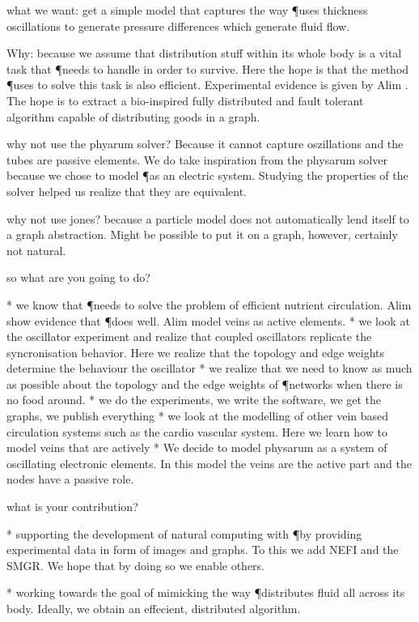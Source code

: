 what we want: get a simple model that captures the way \P uses thickness oscillations to generate pressure differences which generate fluid flow. 

Why: because we assume that distribution stuff within its whole body is a vital task that \P needs to handle in order to survive. Here the hope is that the method \P uses to solve this task is also efficient. Experimental evidence is given by Alim \etal. The hope is to extract a bio-inspired fully distributed and fault tolerant algorithm capable of distributing goods in a graph.

why not use the phyarum solver? Because it cannot capture oszillations and the tubes are passive elements. We do take inspiration from the physarum solver because we chose to model \P as an electric system. Studying the properties of the solver helped us realize that they are equivalent.

why not use jones? because a particle model does not automatically lend itself to a graph abstraction. Might be possible to put it on a graph, however, certainly not natural.

so what are you going to do?

* we know that \P needs to solve the problem of efficient nutrient circulation. Alim \etal show evidence that \P does well. Alim \etal model veins as active elements.
* we look at the oscillator experiment and realize that coupled oscillators replicate the syncronisation behavior. Here we realize that the topology and edge weights determine the behaviour the oscillator
* we realize that we need to know as much as possible about the topology and the edge weights of \P networks when there is no food around.
* we do the experiments, we write the software, we get the graphs, we publish everything
* we look at the modelling of other vein based circulation systems such as the cardio vascular system. Here we learn how to model veins that are actively
* We decide to model physarum as a system of oscillating electronic elements. In this model the veins are the active part and the nodes have a passive role.

what is your contribution?

* supporting the development of natural computing with \P by providing experimental data in form of images and graphs. To this we add NEFI and the SMGR. We hope that by doing so we enable others.

* working towards the goal of mimicking the way \P distributes fluid all across its body. Ideally, we obtain an effecient, distributed algorithm.

